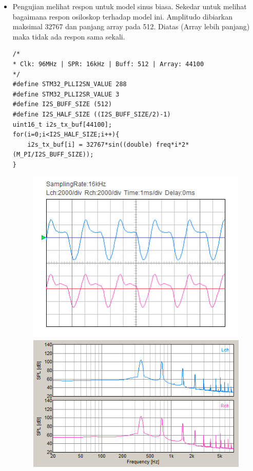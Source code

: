 \documentclass[12pt,]{article}
\begin{document}
\begin{itemize}
\begin{itemize}
		\item Pengujian melihat respon untuk model sinus biasa.
		Sekedar untuk melihat bagaimana respon osiloskop terhadap model ini. 
		Amplitudo dibiarkan maksimal 32767 dan panjang array pada 512.
		Diatas (Array lebih panjang) maka tidak ada respon sama sekali.
		\begin{verbatim}
/*
* Clk: 96MHz | SPR: 16kHz | Buff: 512 | Array: 44100
*/
#define STM32_PLLI2SN_VALUE 288
#define STM32_PLLI2SR_VALUE 3
#define I2S_BUFF_SIZE (512)
#define I2S_HALF_SIZE ((I2S_BUFF_SIZE/2)-1)
uint16_t i2s_tx_buf[44100];
for(i=0;i<I2S_HALF_SIZE;i++){
	i2s_tx_buf[i] = 32767*sin((double) freq*i*2*(M_PI/I2S_BUFF_SIZE));
}
		\end{verbatim}
		\begin{figure}[H]
			\centering
			\includegraphics[width=0.45\linewidth]{result/day_3/400_Hz/osi_sine10}
			\includegraphics[width=0.45\linewidth]{result/day_3/400_Hz/fft_sine10}
		\end{figure}
		

\end{itemize}
\end{itemize}
\end{document}
